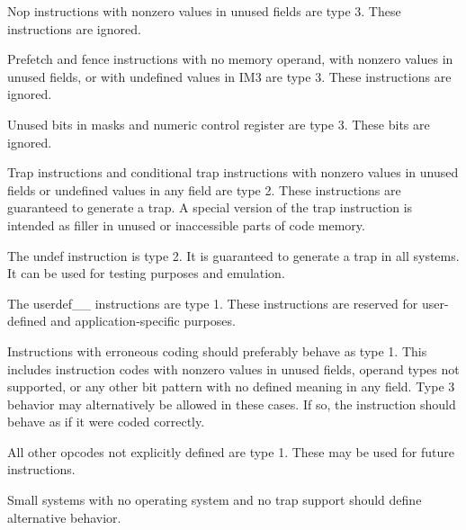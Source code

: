 \documentclass[forwardcom.tex]{subfiles}
\begin{document}
Nop instructions with nonzero values in unused fields are type 3. These instructions are ignored.
\vspace{2mm}

Prefetch and fence instructions with no memory operand, with nonzero values in unused fields, or with undefined values in IM3 are type 3. These instructions are ignored.
\vspace{2mm}

Unused bits in masks and numeric control register are type 3. These bits are ignored.
\vspace{2mm}

Trap instructions and conditional trap instructions with nonzero values in unused fields or undefined values in any field are type 2. These instructions are guaranteed to generate a trap. A special version of the trap instruction is intended as filler in unused or inaccessible parts of code memory.
\vspace{2mm}

The undef instruction is type 2. It is guaranteed to generate a trap in all systems. It can be used for testing purposes and emulation.
\vspace{2mm}

The userdef\_\_ instructions are type 1. These instructions are reserved for user-defined and application-specific purposes.
\vspace{2mm}

Instructions with erroneous coding should preferably behave as type 1. This includes instruction codes with nonzero values in unused fields, operand types not supported, or any other bit pattern with no defined meaning in any field. Type 3 behavior may alternatively be allowed in these cases. If so, the instruction should behave as if it were coded correctly.
\vspace{2mm}

All other opcodes not explicitly defined are type 1. These may be used for future instructions.
\vspace{2mm}

Small systems with no operating system and no trap support should define alternative behavior.

 
\end{document}

